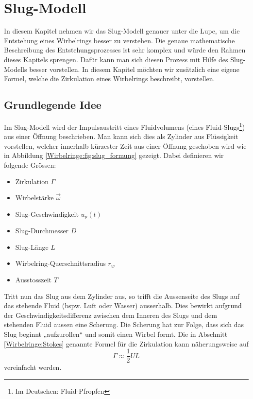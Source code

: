 %
%
%
\section{Slug-Modell}
In diesem Kapitel nehmen wir das Slug-Modell genauer unter die Lupe, um die Entstehung eines Wirbelrings besser zu verstehen.
Die genaue mathematische Beschreibung des Entstehungsprozesses ist sehr komplex und würde den Rahmen dieses Kapitels sprengen.
Dafür kann man sich diesen Prozess mit Hilfe des Slug-Modells besser vorstellen.
In diesem Kapitel möchten wir zusätzlich eine eigene Formel, welche die Zirkulation eines Wirbelrings beschreibt, vorstellen.

\subsection{Grundlegende Idee}
Im Slug-Modell wird der Impulsaustritt eines Fluidvolumens (eines Fluid-Slugs\footnote{Im Deutschen: Fluid-Pfropfen}) aus einer Öffnung beschrieben.
Man kann sich dies als Zylinder aus Flüssigkeit vorstellen, welcher innerhalb kürzester Zeit aus einer Öffnung geschoben wird wie in Abbildung \ref{Wirbelringe:fig:slug_formung} gezeigt.
Dabei definieren wir folgende Grössen:
\begin{itemize}
    \item Zirkulation \(\Gamma\)
    \item Wirbelstärke \(\vec{\omega}\)
    \item Slug-Geschwindigkeit \(u_p(t)\)
    \item Slug-Durchmesser \(D\)
    \item Slug-Länge \(L\)
    \item Wirbelring-Querschnittsradius \(r_w\)
    \item Ausstosszeit \(T\)
\end{itemize}



Tritt nun das Slug aus dem Zylinder aus, so trifft die Aussenseite des Slugs auf das stehende Fluid (bspw. Luft oder Wasser) ausserhalb.
Dies bewirkt aufgrund der Geschwindigkeitsdifferenz zwischen dem Inneren des Slugs und dem stehenden Fluid aussen eine Scherung.
Die Scherung hat zur Folge, dass sich das Slug beginnt „aufzurollen“ und somit einen Wirbel formt.
Die in Abschnitt \ref{Wirbelringe:Stokes} genannte Formel für die Zirkulation kann näherungsweise auf
\begin{equation*}
\Gamma 
\approx 
\frac{1}{2}UL
\end{equation*}
vereinfacht werden.

